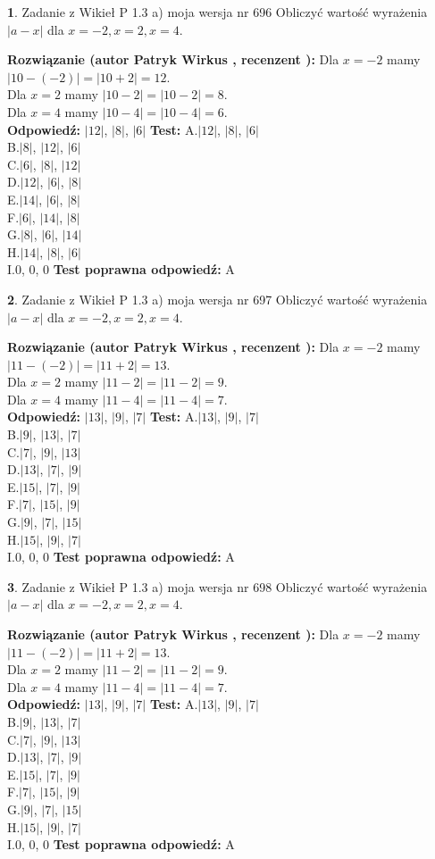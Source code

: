 \documentclass[12pt, a4paper]{article}
\theoremstyle{definition} %
\newtheorem{zad}{}
\newcommand{\zadStart}[1]{\begin{zad}#1\newline}
\newcommand{\zadStop}{\end{zad}}
\newcommand{\rozwStart}[2]{\noindent \textbf{Rozwiązanie (autor #1 , recenzent #2): }\newline}
\newcommand{\rozwStop}{\newline}
\newcommand{\odpStart}{\noindent \textbf{Odpowiedź:}\newline}
\newcommand{\odpStop}{\newline}
\newcommand{\testStart}{\noindent \textbf{Test:}\newline}
\newcommand{\testStop}{\newline}
\newcommand{\kluczStart}{\noindent \textbf{Test poprawna odpowiedź:}\newline}
\newcommand{\kluczStop}{\newline}
\begin{document}
\zadStart{Zadanie z Wikieł P 1.3 a) moja wersja nr 696}
Obliczyć wartość wyrażenia $|a - x|$ dla $x=-2,x=2,x=4$.
\zadStop
\rozwStart{Patryk Wirkus}{}
Dla $x = -2$ mamy $|10 - (-2)| = |10 + 2| = 12$.\\
Dla $x = 2$ mamy $|10 - 2| = |10 - 2| = 8$.\\
Dla $x = 4$ mamy $|10 - 4| = |10 - 4| = 6$.\\
\rozwStop
\odpStart
$|12|$, $|8|$, $|6|$
\odpStop
\testStart
A.$|12|$, $|8|$, $|6|$\\
B.$|8|$, $|12|$, $|6|$\\
C.$|6|$, $|8|$, $|12|$\\
D.$|12|$, $|6|$, $|8|$\\
E.$|14|$, $|6|$, $|8|$\\
F.$|6|$, $|14|$, $|8|$\\
G.$|8|$, $|6|$, $|14|$\\
H.$|14|$, $|8|$, $|6|$\\
I.$0$, $0$, $0$
\testStop
\kluczStart
A
\kluczStop



\zadStart{Zadanie z Wikieł P 1.3 a) moja wersja nr 697}
Obliczyć wartość wyrażenia $|a - x|$ dla $x=-2,x=2,x=4$.
\zadStop
\rozwStart{Patryk Wirkus}{}
Dla $x = -2$ mamy $|11 - (-2)| = |11 + 2| = 13$.\\
Dla $x = 2$ mamy $|11 - 2| = |11 - 2| = 9$.\\
Dla $x = 4$ mamy $|11 - 4| = |11 - 4| = 7$.\\
\rozwStop
\odpStart
$|13|$, $|9|$, $|7|$
\odpStop
\testStart
A.$|13|$, $|9|$, $|7|$\\
B.$|9|$, $|13|$, $|7|$\\
C.$|7|$, $|9|$, $|13|$\\
D.$|13|$, $|7|$, $|9|$\\
E.$|15|$, $|7|$, $|9|$\\
F.$|7|$, $|15|$, $|9|$\\
G.$|9|$, $|7|$, $|15|$\\
H.$|15|$, $|9|$, $|7|$\\
I.$0$, $0$, $0$
\testStop
\kluczStart
A
\kluczStop



\zadStart{Zadanie z Wikieł P 1.3 a) moja wersja nr 698}
Obliczyć wartość wyrażenia $|a - x|$ dla $x=-2,x=2,x=4$.
\zadStop
\rozwStart{Patryk Wirkus}{}
Dla $x = -2$ mamy $|11 - (-2)| = |11 + 2| = 13$.\\
Dla $x = 2$ mamy $|11 - 2| = |11 - 2| = 9$.\\
Dla $x = 4$ mamy $|11 - 4| = |11 - 4| = 7$.\\
\rozwStop
\odpStart
$|13|$, $|9|$, $|7|$
\odpStop
\testStart
A.$|13|$, $|9|$, $|7|$\\
B.$|9|$, $|13|$, $|7|$\\
C.$|7|$, $|9|$, $|13|$\\
D.$|13|$, $|7|$, $|9|$\\
E.$|15|$, $|7|$, $|9|$\\
F.$|7|$, $|15|$, $|9|$\\
G.$|9|$, $|7|$, $|15|$\\
H.$|15|$, $|9|$, $|7|$\\
I.$0$, $0$, $0$
\testStop
\kluczStart
A
\kluczStop
\end{document}
